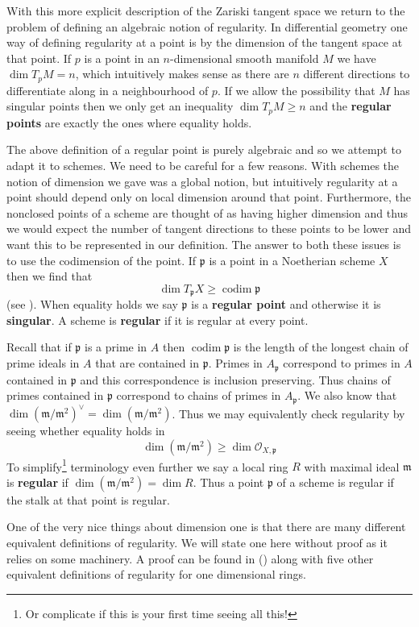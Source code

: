 \documentclass{article}
\DeclareMathOperator{\codim}{codim}
\newcommand{\p}{\ensuremath{\mathfrak{p}}}
\newcommand{\m}{\ensuremath{\mathfrak{m}}}
\newcommand{\Ox}{\mathscr{O}}
\theoremstyle{definition}
\begin{document}
With this more explicit description of the Zariski tangent space we return to the problem of defining an algebraic notion of regularity.
In differential geometry one way of defining regularity at a point is by the dimension of the tangent space at that point.
If $p$ is a point in an $n$-dimensional smooth manifold $M$ we have $\dim T_p M = n$, which intuitively makes sense as there are $n$ different directions to differentiate along in a neighbourhood of $p$.
If we allow the possibility that $M$ has singular points then we only get an inequality $\dim T_p M \geq n$ and the \textbf{regular points} are exactly the ones where equality holds.

The above definition of a regular point is purely algebraic and so we attempt to adapt it to schemes.
We need to be careful for a few reasons.
With schemes the notion of dimension we gave was a global notion, but intuitively regularity at a point should depend only on local dimension around that point.
Furthermore, the nonclosed points of a scheme are thought of as having higher dimension and thus we would expect the number of tangent directions to these points to be lower and want this to be represented in our definition.
The answer to both these issues is to use the codimension of the point.
If $\p$ is a point in a Noetherian scheme $X$ then we find that 
$$\dim T_\p X \geq \codim \p$$
(see \citeauthor[12.2.1]{vakil2017rising}).
When equality holds we say $\p$ is a \textbf{regular point} and otherwise it is \textbf{singular}.
A scheme is \textbf{regular} if it is regular at every point.

Recall that if $\p$ is a prime in $A$ then $\codim \p$ is the length of the longest chain of prime ideals in $A$ that are contained in $\p$.
Primes in $A_\p$ correspond to primes in $A$ contained in $\p$ and this correspondence is inclusion preserving.
Thus chains of primes contained in $\p$ correspond to chains of primes in $A_\p$.
We also know that $\dim(\m/\m^2)^\vee = \dim (\m/\m^2)$.
Thus we may equivalently check regularity by seeing whether equality holds in
$$\dim (\m/\m^2) \geq \dim \Ox_{X,\p}$$
To simplify\footnote{Or complicate if this is your first time seeing all this!} terminology even further we say a local ring $R$ with maximal ideal $\m$ is \textbf{regular} if $\dim(\m/\m^2) = \dim R$.
Thus a point $\p$ of a scheme is regular if the stalk at that point is regular.

One of the very nice things about dimension one is that there are many different equivalent definitions of regularity.
We will state one here without proof as it relies on some machinery.
A proof can be found in (\citeauthor[12.5]{vakil2017rising}) along with five other equivalent definitions of regularity for one dimensional rings.
\end{document}
